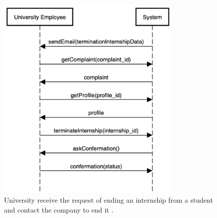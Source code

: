     \begin{figure}[H]
        \centering
        \includegraphics[width=0.8\textwidth]{RASD/Assets/SequenceDiagrams/8-student-end-internship.png}
        \caption{University receive the request of ending an internship from a student and contact the company to end it .}
        \label{fig:University receive the request of ending an internship from a student and contact the company to end it }
    \end{figure}


